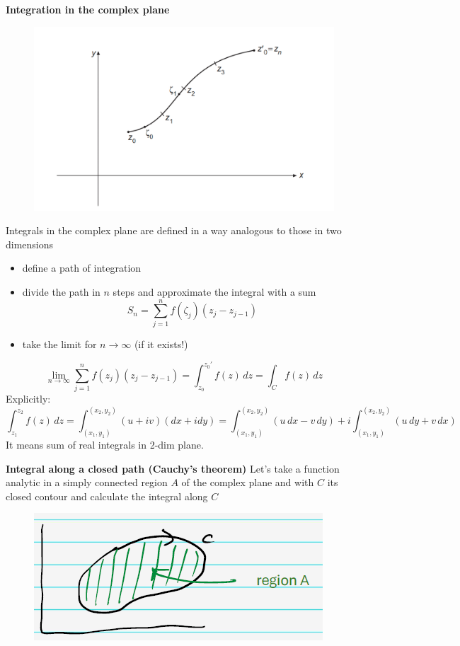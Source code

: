 \documentclass{article}
\begin{document}
\vspace{3mm} \noindent
\textbf{Integration in the complex plane}
\begin{figure}[h]
    \centering
    \includegraphics[width=0.5\linewidth]{fig13.png}
\end{figure}

\noindent
Integrals in the complex plane are defined in a way analogous to those in two dimensions
\begin{itemize}
    \item define a path of integration
    \item divide the path in $n$ steps and approximate the integral with a sum
\[
S_n = \sum_{j=1}^{n} f(\zeta_j)(z_j - z_{j-1})
\]
    \item take the limit for $n\rightarrow \infty$ (if it exists!)
\end{itemize}
\begin{equation}
    \lim_{n \to \infty} \sum_{j=1}^{n} f(z_j)(z_j - z_{j-1})
= \int_{z_0}^{z_0'} f(z) \, dz
= \int_{C} f(z) \, dz
\end{equation}
Explicitly:
\begin{equation}
    \int_{z_1}^{z_2} f(z) \, dz
= \int_{(x_1, y_1)}^{(x_2, y_2)} (u + iv)(dx + i dy)
= \int_{(x_1, y_1)}^{(x_2, y_2)} (u\, dx - v\, dy) + i \int_{(x_1, y_1)}^{(x_2, y_2)} (u\, dy + v\, dx)
\end{equation}
It means sum of real integrals in 2-dim plane.

\vspace{2mm} \noindent
\textbf{Integral along a closed path (Cauchy’s theorem)}
Let’s take a function analytic in a simply connected region $A$ of the complex plane and with $C$ its closed contour and calculate the integral along $C$
\begin{figure}[h]
    \centering
    \includegraphics[width=0.3\linewidth]{fig14.png}
\end{figure}
\end{document}
